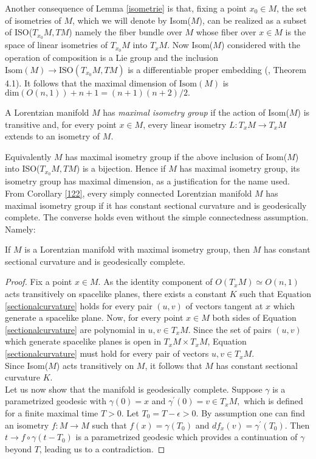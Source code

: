 Another consequence of Lemma \ref{isometrie} is that, fixing a point $x_0 \in M$, the set of isometries of $M$, which we will denote by Isom($M$), can be realized as a subset of ISO($T_{x_0}M, TM$) namely the fiber bundle over $M$ whose fiber over $x\in M$ is the space of linear isometries of $T_{x_0}M$ into $T_{x}M$. Now Isom($M$) considered with the operation of composition is a Lie group and the inclusion $\text{Isom}(M)\to \text{ISO}(T_{x_0}M, TM)$ is a differentiable proper embedding (\cite{okubo_1970}, Theorem 4.1). It follows that the maximal dimension of $\text{Isom}(M)$ is $\text{dim}(O(n,1))+n+1=(n+1)(n+2)/2.$

\begin{definition}
    A Lorentzian manifold $M$ has \textit{maximal isometry group} if the action of Isom($M$) is transitive and, for every point $x \in M$, every linear isometry $L:T_{x}M\to T_xM$ extends to an isometry of $M$. 
\end{definition}

Equivalently $M$ has maximal isometry group if the above inclusion of Isom($M$) into ISO($T_{x_0}M, TM$) is a bijection. Hence if $M$ has maximal isometry group, its isometry group has maximal dimension, as a justification for the name used. 
From Corollary \ref{122}, every simply connected Lorentzian manifold $M$ has maximal isometry group if it has constant sectional curvature and is geodesically complete. The converse holds even without the simple connectedness assumption. Namely: 

\begin{lemma}\label{maximalisometry}
    If $M$ is a Lorentzian manifold with maximal isometry group, then $M$ has constant sectional curvature and is geodesically complete.
\end{lemma}

\begin{proof}
    Fix a point $x\in M$. As the identity component of $O(T_x M)\simeq O(n,1)$ acts transitively on spacelike planes, there exists a constant $K$ such that Equation \ref{sectionalcurvature} holds for every pair $(u,v)$ of vectors tangent at $x$ which generate a spacelike plane. Now, for every point $x\in M$ both sides of Equation \ref{sectionalcurvature} are polynomial in $u,v \in T_xM$. Since the set of pairs $(u,v)$ which generate spacelike planes is open in $T_{x}M\times T_{x}M$, Equation \ref{sectionalcurvature} must hold for every pair of vectors $u,v \in T_xM$.\\ Since Isom($M$) acts transitively on $M$, it follows that $M$ has constant sectional curvature $K$.\\
    Let us now show that the manifold is geodesically complete. Suppose $\gamma$ is a parametrized geodesic with $\gamma(0)=x$ and $\gamma^{\prime} (0)=v\in T_xM,$ which is defined for a finite maximal time $T>0.$ Let $T_0=T-\epsilon>0.$ By assumption one can find an isometry $f:M\to M$ such that $f(x)=\gamma(T_0)$ and $df_x(v)=\gamma^{\prime}(T_0).$ Then $t\to f\circ\gamma(t-T_0)$ is a parametrized geodesic which provides a continuation of $\gamma$ beyond $T$, leading us to a contradiction. 
\end{proof}

